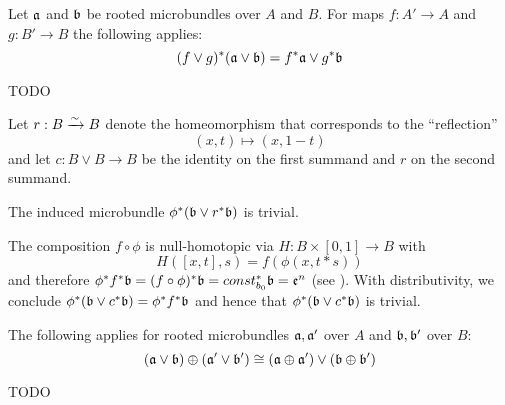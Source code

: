 \begin{mylemma}\label{suspension::distributivity}%
    Let $\mathfrak{a}$ and $\mathfrak{b}$ be rooted microbundles over $A$ and $B$.
    For maps $f: A' \to A$ and $g: B' \to B$ the following applies:
    \[ (f \vee g)^*(\mathfrak{a} \vee \mathfrak{b}) = f^*\mathfrak{a} \vee g^*\mathfrak{b} \]
\end{mylemma}
\begin{myproof}
    TODO   
\end{myproof}

\begin{myparagraph}
    Let $r: B \xrightarrow{\sim} B$ denote the homeomorphism that corresponds to the ``reflection''
    \[ (x, t) \mapsto (x, 1 - t)\]
    and let $c: B \vee B \to B$ be the identity on the first summand and $r$ on the second summand.
\end{myparagraph}
\begin{mylemma}\label{suspension::reflection}
    The induced microbundle $\phi^*(\mathfrak{b} \vee r^*\mathfrak{b})$ is trivial.
\end{mylemma}
\begin{myproof}
    The composition $f \circ \phi$ is null-homotopic via $H: B \times [0, 1] \to B$ with
    \[ H([x, t], s) = f(\phi(x, t * s)) \]
    and therefore $\phi^*f^*\mathfrak{b} = (f \circ \phi)^*\mathfrak{b} = const_{b_0}^*\mathfrak{b} = \mathfrak{e}^n$ (see ).
    With distributivity, we conclude $\phi^*(\mathfrak{b} \vee c^*\mathfrak{b}) = \phi^*f^*\mathfrak{b}$ and hence that $\phi^*(\mathfrak{b} \vee c^*\mathfrak{b})$ is trivial.
\end{myproof}

\begin{mylemma}\label{suspension::compatability}   
    The following applies for rooted microbundles $\mathfrak{a}, \mathfrak{a}'$ over $A$ and $\mathfrak{b}, \mathfrak{b}'$ over $B$: 
    \[ (\mathfrak{a} \vee \mathfrak{b}) \oplus (\mathfrak{a}' \vee \mathfrak{b}') \cong (\mathfrak{a} \oplus \mathfrak{a}') \vee (\mathfrak{b} \oplus \mathfrak{b}') \]
\end{mylemma}
\begin{myproof}
    TODO
\end{myproof}